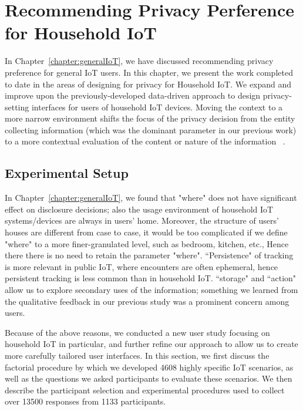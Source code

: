 \chapter{Recommending Privacy Perference for Household IoT}\label{chapter:householdIoT}

In Chapter~\ref{chapter:generalIoT}, we have discussed recommending privacy preference for general IoT users. In this chapter, we present the work completed to date in the areas of designing for privacy for Household IoT. We expand and improve upon the previously-developed data-driven approach to design privacy-setting interfaces for users of household IoT devices. Moving the context to a more narrow environment shifts the focus of the privacy decision from the entity collecting information (which was the dominant parameter in our previous work) to a more contextual evaluation of the content or nature of the information ~\cite{nissenbaum_privacy_2004}.

\section{Experimental Setup}\label{sec:exp_setup}
In Chapter~\ref{chapter:generalIoT}, we found that "where" does not have significant effect on disclosure decisions; also the usage environment of household IoT systems/devices are always in users' home. Moreover, the structure of users' houses are different from case to case, it would be too complicated if we define "where" to a more finer-granulated level, such as bedroom, kitchen, etc.,  Hence there there is no need to retain the parameter "where". ``Persistence" of tracking is more relevant in public IoT, where encounters are often ephemeral, hence persistent tracking is less common than in household IoT. ``storage" and ``action" allow us to explore secondary uses of the information; something we learned from the qualitative feedback in our previous study was a prominent concern among users.

Because of the above reasons, we conducted a new user study focusing on household IoT in particular, and further refine our approach to allow us to create more carefully tailored user interfaces. In this section, we first discuss the factorial procedure by which we developed 4608 highly specific IoT scenarios, as well as the questions we asked participants to evaluate these scenarios. We then describe the participant selection and experimental procedures used to collect over 13500 responses from 1133 participants.

